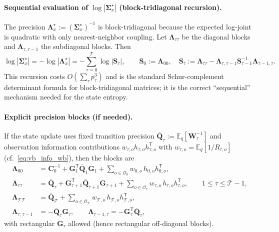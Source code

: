 \documentclass[11pt]{article}
\newcommand{\1}{\mathbb{I}}
\newcommand{\T}{\mathsf{T}}
\newcommand{\E}{\mathbb{E}}
\begin{document}
\paragraph{Sequential evaluation of $\log|\bm\Sigma_x^\star|$ (block-tridiagonal recursion).}
The precision $\bm\Lambda_x^\star := (\bm\Sigma_x^\star)^{-1}$ is block-tridiagonal because the expected log-joint
is quadratic with only nearest-neighbor coupling. Let $\bm\Lambda_{\tau\tau}$ be the diagonal blocks and
$\bm\Lambda_{\tau,\tau-1}$ the subdiagonal blocks. Then
\begin{equation}
\log|\bm\Sigma_x^\star| = -\log|\bm\Lambda_x^\star|
= -\sum_{\tau=0}^{\mathcal{T}} \log|\bm S_\tau|,
\qquad
\bm S_0:=\bm\Lambda_{00},\quad
\bm S_\tau:=\bm\Lambda_{\tau\tau}-\bm\Lambda_{\tau,\tau-1}\bm S_{\tau-1}^{-1}\bm\Lambda_{\tau-1,\tau}.
\label{eq:block_tridiag_logdet}
\end{equation}
This recursion costs $O(\sum_\tau p_\tau^3)$ and is the standard Schur-complement determinant formula for
block-tridiagonal matrices; it is the correct ``sequential'' mechanism needed for the state entropy.

\paragraph{Explicit precision blocks (if needed).}
If the state update uses fixed transition precision $\bar{\bm Q}_\tau:=\E_q[\bm W_\tau^{-1}]$ and
observation information contributions $w_{\tau,o} h_{\tau,o}h_{\tau,o}^\T$ with
$w_{\tau,o}=\E_q[1/R_{\tau,o}]$ (cf.\ \eqref{eq:vb_info_wb}), then the blocks are
\begin{align}
\bm\Lambda_{00} &= \bm C_0^{-1} + \bm G_1^\T \bar{\bm Q}_1 \bm G_1 + \sum_{o\in\mathcal{O}_0} w_{0,o}\,h_{0,o}h_{0,o}^\T, \nonumber\\
\bm\Lambda_{\tau\tau} &= \bar{\bm Q}_\tau + \bm G_{\tau+1}^\T \bar{\bm Q}_{\tau+1}\bm G_{\tau+1}
+ \sum_{o\in\mathcal{O}_\tau} w_{\tau,o}\,h_{\tau,o}h_{\tau,o}^\T,\qquad 1\le\tau\le \mathcal{T}-1,\nonumber\\
\bm\Lambda_{\mathcal{T}\mathcal{T}} &= \bar{\bm Q}_{\mathcal{T}} + \sum_{o\in\mathcal{O}_{\mathcal{T}}} w_{\mathcal{T},o}\,h_{\mathcal{T},o}h_{\mathcal{T},o}^\T, \nonumber\\
\bm\Lambda_{\tau,\tau-1} &= -\bar{\bm Q}_\tau \bm G_\tau,\qquad
\bm\Lambda_{\tau-1,\tau} = -\bm G_\tau^\T \bar{\bm Q}_\tau,
\label{eq:precision_blocks_states}
\end{align}
with rectangular $\bm G_\tau$ allowed (hence rectangular off-diagonal blocks).
\end{document}
